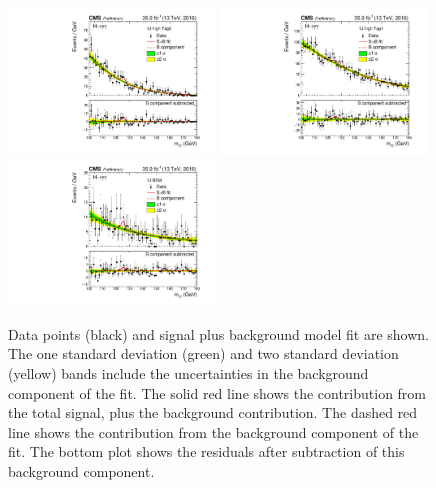\begin{figure}[hptb]
  \centering
  \includegraphics[width=0.49\textwidth]{Figures/Appendices/_forAppendix2016ch1_RECO_1J_PTH_120_200_Tag0_13TeV.pdf}
  \includegraphics[width=0.49\textwidth]{Figures/Appendices/_forAppendix2016ch1_RECO_1J_PTH_120_200_Tag1_13TeV.pdf}
  \includegraphics[width=0.49\textwidth]{Figures/Appendices/_forAppendix2016ch1_RECO_1J_PTH_GT200_13TeV.pdf}
  \caption[Signal plus background fits to data.]
  {
    Data points (black) and signal plus background model fit are shown. 
    The one standard deviation (green) and two standard deviation (yellow) bands 
    include the uncertainties in the background component of the fit. 
    The solid red line shows the contribution from the total signal, plus the background contribution. 
    The dashed red line shows the contribution from the background component of the fit. 
    The bottom plot shows the residuals after subtraction of this background component.
  }
\end{figure}

